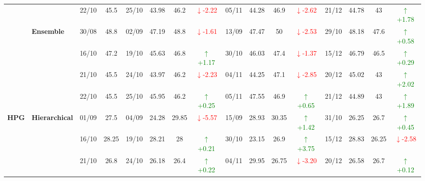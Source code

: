 {\begin{longtable}{llcc|cccc|cccc|cccc}
&
& 22/10 & 45.5 & 25/10 & 43.98 & 46.2 & \textcolor{red}{\(\downarrow\)-2.22} & 05/11 & 44.28 & 46.9 & \textcolor{red}{\(\downarrow\)-2.62} & 21/12 & 44.78 & 43 & \textcolor{green}{\(\uparrow\)+1.78} \\
\cmidrule(lr){2-16}



& \textbf{Ensemble}
& 30/08 & 48.8 & 02/09 & 47.19 & 48.8 & \textcolor{red}{\(\downarrow\)-1.61} & 13/09 & 47.47 & 50 & \textcolor{red}{\(\downarrow\)-2.53} & 29/10 & 48.18 & 47.6 & \textcolor{green}{\(\uparrow\)+0.58} \\

&
& 16/10 & 47.2 & 19/10 & 45.63 & 46.8 & \textcolor{green}{\(\uparrow\)+1.17} & 30/10 & 46.03 & 47.4 & \textcolor{red}{\(\downarrow\)-1.37} & 15/12 & 46.79 & 46.5 & \textcolor{green}{\(\uparrow\)+0.29} \\

&
& 21/10 & 45.5 & 24/10 & 43.97 & 46.2 & \textcolor{red}{\(\downarrow\)-2.23} & 04/11 & 44.25 & 47.1 & \textcolor{red}{\(\downarrow\)-2.85} & 20/12 & 45.02 & 43 & \textcolor{green}{\(\uparrow\)+2.02} \\

&
& 22/10 & 45.5 & 25/10 & 45.95 & 46.2 & \textcolor{green}{\(\uparrow\)+0.25} & 05/11 & 47.55 & 46.9 & \textcolor{green}{\(\uparrow\)+0.65} & 21/12 & 44.89 & 43 & \textcolor{green}{\(\uparrow\)+1.89} \\
\midrule


\multirow{12}{*}{\textbf{HPG}} 
& \textbf{Hierarchical}
& 01/09 & 27.5 & 04/09 & 24.28 & 29.85 & \textcolor{red}{\(\downarrow\)-5.57} & 15/09 & 28.93 & 30.35 & \textcolor{green}{\(\uparrow\)+1.42} & 31/10 & 26.25 & 26.7 & \textcolor{green}{\(\uparrow\)+0.45} \\

& 
& 16/10 & 28.25 & 19/10 & 28.21 & 28 & \textcolor{green}{\(\uparrow\)+0.21} & 30/10 & 23.15 & 26.9 & \textcolor{green}{\(\uparrow\)+3.75} & 15/12 & 28.83 & 26.25 & \textcolor{red}{\(\downarrow\)-2.58} \\

& 
& 21/10 & 26.8 & 24/10 & 26.18 & 26.4 & \textcolor{green}{\(\uparrow\)+0.22} & 04/11 & 29.95 & 26.75 & \textcolor{red}{\(\downarrow\)-3.20} & 20/12 & 26.58 & 26.7 & \textcolor{green}{\(\uparrow\)+0.12} \\


\end{longtable}}
